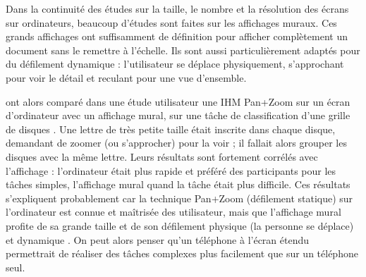 Dans la continuité des études sur la taille, le nombre et la résolution des écrans sur ordinateurs, beaucoup d'études sont faites sur les affichages muraux. Ces grands affichages ont suffisamment de définition pour afficher complètement un document sans le remettre à l'échelle. Ils sont aussi particulièrement adaptés pour du défilement dynamique : l'utilisateur se déplace physiquement, s'approchant pour voir le détail et reculant pour une vue d'ensemble.


\cite{Liu2014} ont alors comparé dans une étude utilisateur une IHM Pan+Zoom sur un écran d'ordinateur avec un affichage mural, sur une tâche de classification d'une grille de disques . Une lettre de très petite taille était inscrite dans chaque disque, demandant de zoomer (ou s'approcher) pour la voir ; il fallait alors grouper les disques avec la même lettre. Leurs résultats sont fortement corrélés avec l'affichage : l'ordinateur était plus rapide et préféré des participants pour les tâches simples, l'affichage mural quand la tâche était plus difficile. Ces résultats s'expliquent probablement car la technique Pan+Zoom (défilement statique) sur l'ordinateur est connue et maîtrisée des utilisateur, mais que l'affichage mural profite de sa grande taille \citep{Czerwinski2003} et de son défilement physique (la personne se déplace) et dynamique \citep{Mehra2006}. On peut alors penser qu'un téléphone à l'écran étendu permettrait de réaliser des tâches complexes plus facilement que sur un téléphone seul.


